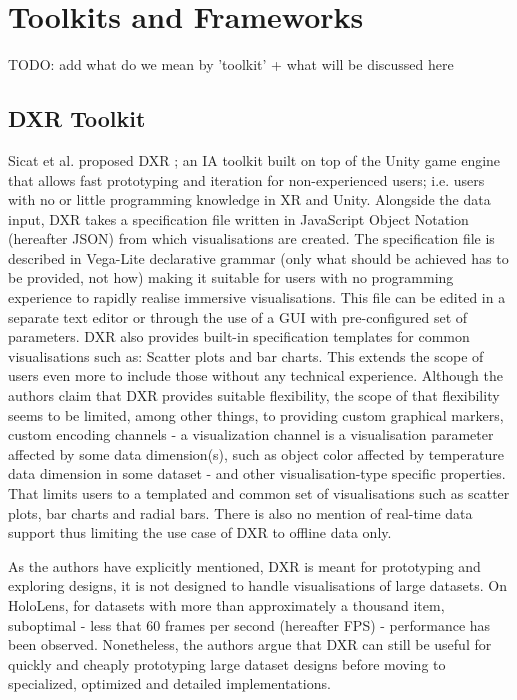 \documentclass{vgtc}                          %
\begin{document}
\section{Toolkits and Frameworks}

TODO: add what do we mean by 'toolkit' + what will be discussed here

\subsection{DXR Toolkit}

Sicat et al. proposed DXR \cite{dxr_toolkit}; an IA toolkit built on top of the Unity game engine
that allows fast prototyping and iteration for non-experienced users; i.e.
users with no or little programming knowledge in XR and Unity.
Alongside the data input, DXR takes a specification file written in JavaScript
Object Notation (hereafter JSON) from which visualisations are created.
The specification file is described in Vega-Lite declarative grammar \cite{vega_lite}
(only what should be achieved has to be provided, not how) making it suitable
for users with no programming experience to rapidly realise immersive
visualisations. This file can be edited in a separate text editor or through
the use of a GUI with pre-configured set of parameters. DXR also provides
built-in specification templates for common visualisations such as: Scatter
plots and bar charts. This extends the scope of users even more to include
those without any technical experience. Although the authors claim that DXR
provides suitable flexibility, the scope of that flexibility seems to be
limited, among other things, to providing custom graphical markers, custom
encoding channels - a visualization channel is a visualisation parameter affected by some
data dimension(s), such as object color affected by temperature data dimension in some dataset -
and other visualisation-type specific properties. That limits users to a
templated and common set of visualisations such as scatter plots, bar charts
and radial bars. There is also no mention of real-time data support thus
limiting the use case of DXR to offline data only.

\smallskip

\noindent As the authors have explicitly mentioned, DXR is meant for
prototyping and exploring designs, it is not designed to handle visualisations
of large datasets. On HoloLens, for datasets with more than approximately
a thousand item, suboptimal - less that 60 frames per second (hereafter FPS) -
performance has been observed. Nonetheless, the authors argue that DXR can still
be useful for quickly and cheaply prototyping large dataset designs before
moving to specialized, optimized and detailed implementations.
\end{document}
